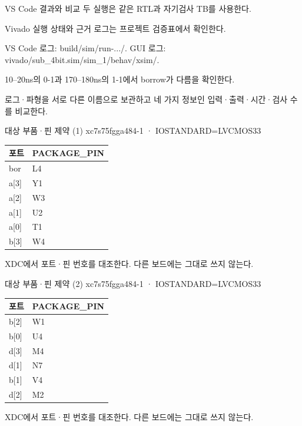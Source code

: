 \begin{frame}{VS Code 결과와 비교}\relax
\small
두 실행은 같은 RTL과 자기검사 TB를 사용한다.\par\vspace{0.22cm}Vivado 실행 상태와 근거 로그는 프로젝트 검증표에서 확인한다.\par\vspace{0.22cm}VS Code 로그: build/sim/run-.../. GUI 로그: vivado/sub\_4bit.sim/sim\_1/behav/xsim/.\par\vspace{0.22cm}10–20ns의 0-1과 170–180ns의 1-1에서 borrow가 다름을 확인한다.\par\vspace{0.22cm}로그·파형을 서로 다른 이름으로 보관하고 네 가지 정보인 입력·출력·시간·검사 수를 비교한다.\par
\end{frame}

\begin{frame}{대상 부품·핀 제약 (1)}\relax
\small
xc7s75fgga484-1 · IOSTANDARD=LVCMOS33\par\begin{center}\renewcommand{\arraystretch}{1.45}
\begin{tabular}{l|l}
포트 & PACKAGE\_PIN\\\hline
bor & L4\\
a[3] & Y1\\
a[2] & W3\\
a[1] & U2\\
a[0] & T1\\
b[3] & W4\\
\end{tabular}\end{center}
XDC에서 포트·핀 번호를 대조한다. 다른 보드에는 그대로 쓰지 않는다.\par
\end{frame}

\begin{frame}{대상 부품·핀 제약 (2)}\relax
\small
xc7s75fgga484-1 · IOSTANDARD=LVCMOS33\par\begin{center}\renewcommand{\arraystretch}{1.45}
\begin{tabular}{l|l}
포트 & PACKAGE\_PIN\\\hline
b[2] & W1\\
b[0] & U4\\
d[3] & M4\\
d[1] & N7\\
b[1] & V4\\
d[2] & M2\\
\end{tabular}\end{center}
XDC에서 포트·핀 번호를 대조한다. 다른 보드에는 그대로 쓰지 않는다.\par
\end{frame}

